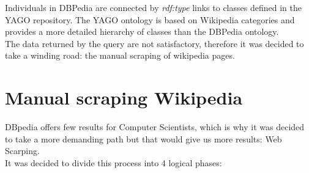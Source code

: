 \documentclass[12pt, twoside]{article}
\begin{document}
Individuals in DBPedia are connected by \textit{rdf:type} links to classes defined in the YAGO repository. The YAGO ontology is based on Wikipedia categories and provides a more detailed hierarchy of classes than the DBPedia ontology.\\
The data returned by the query are not satisfactory, therefore it was decided to take a winding road: the manual scraping of wikipedia pages.





\newpage

\section{Manual scraping Wikipedia}
DBpedia offers few results for Computer Scientists, which is why it was decided to take a more demanding path but that would give us more results: Web Scarping. \\
It was decided to divide this process into 4 logical phases:
\end{document}

